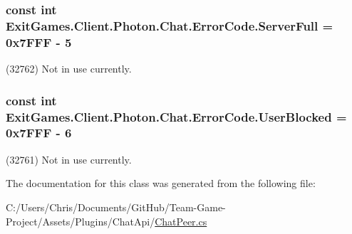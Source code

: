 \subsubsection[{\texorpdfstring{Server\+Full}{ServerFull}}]{\setlength{\rightskip}{0pt plus 5cm}const int Exit\+Games.\+Client.\+Photon.\+Chat.\+Error\+Code.\+Server\+Full = 0x7\+F\+F\+F -\/ 5}\hypertarget{class_exit_games_1_1_client_1_1_photon_1_1_chat_1_1_error_code_a2c770f32de9265fe53d881768167d7b4}{}\label{class_exit_games_1_1_client_1_1_photon_1_1_chat_1_1_error_code_a2c770f32de9265fe53d881768167d7b4}


(32762) Not in use currently.

\subsubsection[{\texorpdfstring{User\+Blocked}{UserBlocked}}]{\setlength{\rightskip}{0pt plus 5cm}const int Exit\+Games.\+Client.\+Photon.\+Chat.\+Error\+Code.\+User\+Blocked = 0x7\+F\+F\+F -\/ 6}\hypertarget{class_exit_games_1_1_client_1_1_photon_1_1_chat_1_1_error_code_a989671a923b1616f8831545f9e5baf01}{}\label{class_exit_games_1_1_client_1_1_photon_1_1_chat_1_1_error_code_a989671a923b1616f8831545f9e5baf01}


(32761) Not in use currently.



The documentation for this class was generated from the following file\+:\begin{DoxyCompactItemize}
\item 
C\+:/\+Users/\+Chris/\+Documents/\+Git\+Hub/\+Team-\/\+Game-\/\+Project/\+Assets/\+Plugins/\+Chat\+Api/\hyperlink{_chat_peer_8cs}{Chat\+Peer.\+cs}\end{DoxyCompactItemize}
